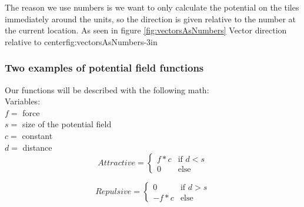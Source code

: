 		The reason we use numbers is we want to only calculate the potential on the tiles immediately around the units, so the direction is given relative to the number at the current location. As seen in figure \ref{fig:vectorsAsNumbers}
		{Vector direction relative to center}{fig:vectorsAsNumbers}{-3in}
		\\
		
		\subsubsection{Two examples of potential field functions}
		Our functions will be described with the following math: \\
		
		Variables:\\
		$f =$ force\\
		$s =$ size of the potential field\\
		$c =$ constant\\
		$d =$ distance\\
		
		\begin{displaymath}
			Attractive = \begin{cases}
					f * c & \text{if $d < s$}\\
					0 & \text{else}
				\end{cases}		
		\end{displaymath}
			
		\begin{displaymath}
			Repulsive = \begin{cases}
					0 & \text{if $d > s$}\\
					- f * c & \text{else}
				\end{cases}		
		\end{displaymath}
		
		
